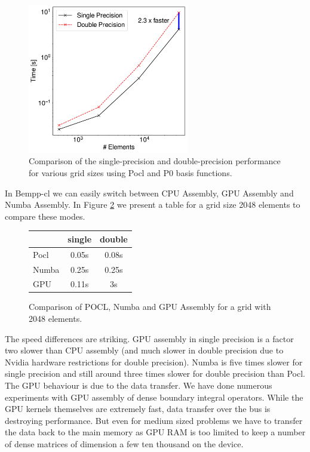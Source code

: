 \begin{figure}
	\center
	\includegraphics[width=7cm]{img/pocl_single_layer.pdf}
	\caption{Comparison of the single-precision and double-precision performance for various grid sizes using Pocl and P0 basis functions.}
	\label{fig:pocl_single_layer}
\end{figure}

In Bempp-cl we can easily switch between CPU Assembly, GPU Assembly and Numba Assembly. In Figure \ref{fig:cpu_gpu_numba_compare} we present a table for a grid size 2048 elements to compare these modes.
\begin{figure}
\begin{center}
\begin{tabular}{l|c|c}
	        &   single      &    double\\
	        \hline
	 Pocl   &   0.05s       &    0.08s\\
	 Numba  &   0.25s       &    0.25s\\
	 GPU    &   0.11s       &    3s\\
\end{tabular}
\end{center}
\caption{Comparison of POCL, Numba and GPU Assembly for a grid with 2048 elements.}
\label{fig:cpu_gpu_numba_compare}
\end{figure}
The speed differences are striking. GPU assembly in single precision is a factor two slower than CPU assembly (and much slower in double precision due to Nvidia hardware restrictions for double precision). Numba is five times slower for single precision and still around three times slower for double precision than Pocl. The GPU behaviour is due to the data transfer. We have done numerous experiments with GPU assembly of dense boundary integral operators. While the GPU kernels themselves are extremely fast, data transfer over the bus is destroying performance. But even for medium sized problems we have to transfer the data back to the main memory as GPU RAM is too limited to keep a number of dense matrices of dimension a few ten thousand on the device.

